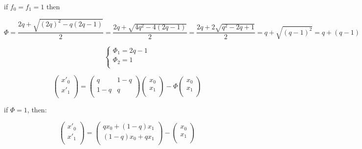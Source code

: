 if  $f_0 = f_1 = 1$ then

\[\varPhi = \frac{2q + \sqrt{(2q)^2 - q(2q-1)}}{2} = \frac{2q+\sqrt{4q^2 - 4(2q-1)}}{2} = \frac{2q+2\sqrt{q^2-2q+1}}{2} = q + \sqrt{(q-1)^2} = q + (q-1) \]

\[ \left\{ \begin{array}{l}
         \varPhi_1 = 2q-1\\
         \varPhi_2 =1\\
       \end{array} \right. \] 

\[ \begin{pmatrix}
         x'_0\\
         x'_1\\
       \end{pmatrix}  = 
       \begin{pmatrix}
                q & 1-q\\
                1-q & q\\
              \end{pmatrix}
              \begin{pmatrix}
                             x_0\\
                              x_1\\
                            \end{pmatrix} - \varPhi \begin{pmatrix}
                                            x_0\\
                                            x_1\\
                                          \end{pmatrix} \] 

if $\varPhi = 1$, then:

\[ \begin{pmatrix}
         x'_0\\
         x'_1\\
       \end{pmatrix} = \begin{pmatrix}
                qx_0 + (1-q)x_1\\
                (1-q)x_0+qx_1\\
              \end{pmatrix} - \begin{pmatrix}
                       x_0\\
                       x_1\\
                     \end{pmatrix} \]
                     
